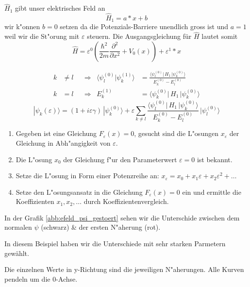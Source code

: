 \begin{refsection}
$\hat H_1$ gibt unser elektrisches Feld an
\[
  \hat H_1 = a*x + b
\]
wir k"onnen $b = 0$ setzen da die Potenzials-Barriere unendlich gross ist und $a = 1$ weil wir die St"orung mit $\varepsilon$ steuern.
Die Ausgangsgleichung f\"ur $\hat{H}$ lautet somit
\[
  \hat{H} = \varepsilon^0 ( \frac{\hbar^2}{2m} \frac{\partial^2}{\partial x^2} + V_0(x) )
            + \varepsilon^1*x
\]



\begin{equation}
\begin{aligned}
k&\ne l
&&\Rightarrow&
\langle\psi_l^{(0)}|\psi_k^{(1)}\rangle
&=
\frac{\langle \psi_l^{(0)}|\, H_1 \,|\psi_k^{(0)}\rangle}{E_k^{(0)}-E_l^{(0)}}
\\
k&=l
&&\Rightarrow&
E_k^{(1)}
&=
\langle \psi_k^{(0)}|\, H_1 \,|\psi_k^{(0)}\rangle
\end{aligned}
\end{equation}
\begin{equation}
|\psi_k(\varepsilon)\rangle
=
(1+i\varepsilon \gamma)
\,|\psi_k^{(0)}\rangle
+
\varepsilon
\sum_{k\ne l}
\frac{\langle \psi_l^{(0)}|\, H_1 \,|\psi_k^{(0)}\rangle}{E_k^{(0)}-E_l^{(0)}}
\,
|\psi_l^{(0)}\rangle
\end{equation}

\begin{enumerate}
\item Gegeben ist eine Gleichung $F_\varepsilon(x)=0$, gesucht
sind die L"osungen $x_\varepsilon$ der Gleichung in Abh"angigkeit von
$\varepsilon$.
\item Die L"osung $x_0$ der Gleichung f"ur den Parameterwert $\varepsilon=0$
ist bekannt.
\item Setze die L"osung in Form einer Potenzreihe an:
$x_\varepsilon = x_0+x_1\varepsilon+x_2\varepsilon^2+\dots$
\item Setze den L"osungsansatz in die Gleichung $F_\varepsilon(x)=0$ ein
und ermittle die Koeffizienten $x_1,x_2,\dots$ durch Koeffizientenvergleich.
\end{enumerate}

In der Grafik \ref{abb:efeld_psi_gestoert} sehen wir die Unterschide zwischen dem normalen $\psi$ (schwarz) \& der ersten N"aherung (rot).

In diesem Beispiel haben wir die Unterschiede mit sehr starken Parmetern gewählt.

Die einzelnen Werte in y-Richtung sind die jeweiligen N"aherungen. Alle Kurven pendeln um die 0-Achse.


\end{refsection}
